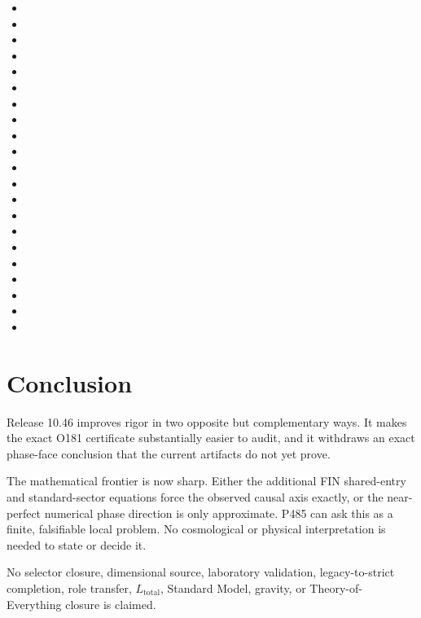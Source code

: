\documentclass[11pt,a4paper,openany]{report}
\begin{document}
\begin{itemize}
\item {}
\item {}
\item {}
\item {}
\item {}
\item {}
\item {}
\item {}
\item {}
\item {}
\item {}
\item {}
\item {}
\item {}
\item {}
\item {}
\item {}
\item {}
\item {}
\item {}
\item {}
\end{itemize}

\chapter{Conclusion}

Release 10.46 improves rigor in two opposite but complementary ways. It makes
the exact O181 certificate substantially easier to audit, and it withdraws an
exact phase-face conclusion that the current artifacts do not yet prove.

The mathematical frontier is now sharp. Either the additional FIN
shared-entry and standard-sector equations force the observed causal axis
exactly, or the near-perfect numerical phase direction is only approximate.
P485 can ask this as a finite, falsifiable local problem. No cosmological or
physical interpretation is needed to state or decide it.

No selector closure, dimensional source, laboratory validation,
legacy-to-strict completion, role transfer, \(L_{\mathrm{total}}\), Standard
Model, gravity, or Theory-of-Everything closure is claimed.
\end{document}
